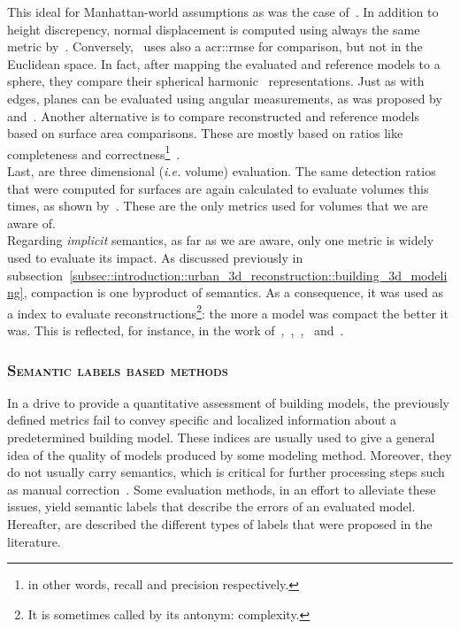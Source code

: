             This ideal for Manhattan-world assumptions as was the case of~\textcite{zebedin2008fusion}.
            In addition to height discrepency, normal displacement is computed using always the same metric by~\textcite{henricsson19973}.
            Conversely,~\textcite{zeng2014multicriteria} uses also a \gls{acr::rmse} for comparison, but not in the Euclidean space.
            In fact, after mapping the evaluated and reference models to a sphere, they compare their spherical harmonic~\parencite{brechbuhler1995parametrization} representations.
            Just as with edges, planes can be evaluated using angular measurements, as was proposed by~\textcite{landes2012quality} and~\textcite{henricsson19973}.
            Another alternative is to compare reconstructed and reference models based on surface area comparisons.
            These are mostly based on ratios like completeness and correctness\footnote{in other words, recall and precision respectively.}~\parencite{rottensteiner2014results,landes2012quality,henricsson19973,schuster2003new}.\\
            Last, are three dimensional (\textit{i.e.} volume) evaluation.
            The same detection ratios that were computed for surfaces are again calculated to evaluate volumes this times, as shown by~\textcite{mohamed2013quality, zeng2014multicriteria,jaynes2003recognition,nguatem2017modeling}.
            These are the only metrics used for volumes that we are aware of.\\

            Regarding \textit{implicit} semantics, as far as we are aware, only one metric is widely used to evaluate its impact.
            As discussed previously in subsection~\ref{subsec::introduction::urban_3d_reconstruction::building_3d_modeling}, compaction is one byproduct of semantics.
            As a consequence, it was used as a index to evaluate reconstructions\footnote{It is sometimes called by its antonym: complexity.}: the more a model was compact the better it was.
            This is reflected, for instance, in the work of~\textcite{lafarge2012creating},~\textcite{zhang2017deep},~\textcite{duan_eccv16},~\textcite{zeng2018neural} and~\textcite{zhu2018large}.

        \subsubsection{\textsc{Semantic labels based methods}}
            In a drive to provide a quantitative assessment of building models, the previously defined metrics fail to convey specific and localized information about a predetermined building model.
            These indices are usually used to give a general idea of the quality of models produced by some modeling method.
            Moreover, they do not usually carry semantics, which is critical for further processing steps such as manual correction~\parencite{elberink2011quality}.
            Some evaluation methods, in an effort to alleviate these issues, yield semantic labels that describe the errors of an evaluated model.
            Hereafter, are described the different types of labels that were proposed in the literature.\\

